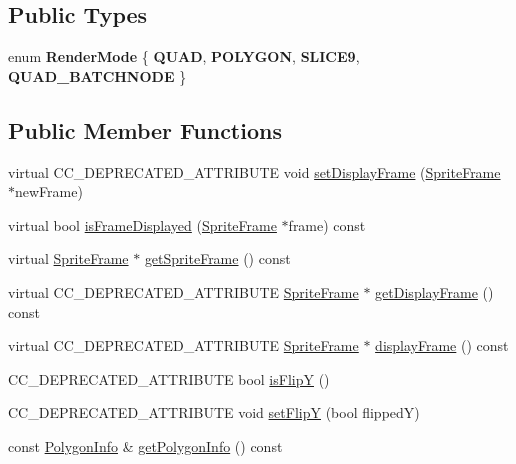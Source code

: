 \subsection*{Public Types}
\begin{DoxyCompactItemize}
\item 
\mbox{\label{classSprite_a3cfa7db0a88d4336026629cf255bd070}} 
enum {\bfseries Render\+Mode} \{ {\bfseries Q\+U\+AD}, 
{\bfseries P\+O\+L\+Y\+G\+ON}, 
{\bfseries S\+L\+I\+C\+E9}, 
{\bfseries Q\+U\+A\+D\+\_\+\+B\+A\+T\+C\+H\+N\+O\+DE}
 \}
\end{DoxyCompactItemize}
\subsection*{Public Member Functions}
\begin{DoxyCompactItemize}
\item 
virtual C\+C\+\_\+\+D\+E\+P\+R\+E\+C\+A\+T\+E\+D\+\_\+\+A\+T\+T\+R\+I\+B\+U\+TE void \hyperlink{classSprite_adb32a70df269965d534e49600ab9ff13}{set\+Display\+Frame} (\hyperlink{classSpriteFrame}{Sprite\+Frame} $\ast$new\+Frame)
\item 
virtual bool \hyperlink{classSprite_aa457a666fd9c5620ff2290320748f79c}{is\+Frame\+Displayed} (\hyperlink{classSpriteFrame}{Sprite\+Frame} $\ast$frame) const
\item 
virtual \hyperlink{classSpriteFrame}{Sprite\+Frame} $\ast$ \hyperlink{classSprite_abdda1faf423bfcb61dd253399247626c}{get\+Sprite\+Frame} () const
\item 
virtual C\+C\+\_\+\+D\+E\+P\+R\+E\+C\+A\+T\+E\+D\+\_\+\+A\+T\+T\+R\+I\+B\+U\+TE \hyperlink{classSpriteFrame}{Sprite\+Frame} $\ast$ \hyperlink{classSprite_a397ae5a00212e31172695b8faa4aff4e}{get\+Display\+Frame} () const
\item 
virtual C\+C\+\_\+\+D\+E\+P\+R\+E\+C\+A\+T\+E\+D\+\_\+\+A\+T\+T\+R\+I\+B\+U\+TE \hyperlink{classSpriteFrame}{Sprite\+Frame} $\ast$ \hyperlink{classSprite_afe9089c5db5d653709d63c943b6a6637}{display\+Frame} () const
\item 
C\+C\+\_\+\+D\+E\+P\+R\+E\+C\+A\+T\+E\+D\+\_\+\+A\+T\+T\+R\+I\+B\+U\+TE bool \hyperlink{classSprite_aed312876fd0527225526da4af119727b}{is\+FlipY} ()
\item 
C\+C\+\_\+\+D\+E\+P\+R\+E\+C\+A\+T\+E\+D\+\_\+\+A\+T\+T\+R\+I\+B\+U\+TE void \hyperlink{classSprite_a69358c4c56221ae9435a4c83074f0151}{set\+FlipY} (bool flippedY)
\item 
const \hyperlink{classPolygonInfo}{Polygon\+Info} \& \hyperlink{classSprite_a9beedbe83484db30d0fe595b3d12d5e9}{get\+Polygon\+Info} () const

\end{DoxyCompactItemize}
